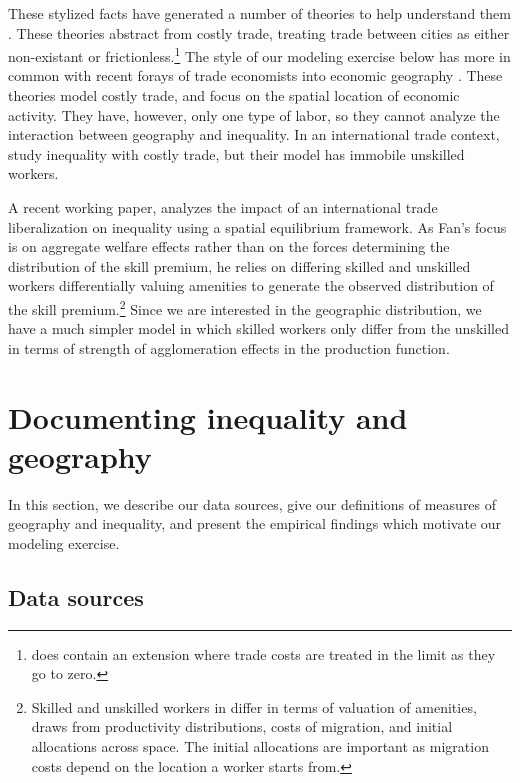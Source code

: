 \documentclass[12 pt]{article}
\begin{document}
These stylized facts have generated a number of theories to help understand them \citep{davis2012spatial,davis2014comparative,baum2012understanding,combes2012sorting}.  These theories abstract from costly trade, treating trade between cities as either non-existant or frictionless.\footnote{\citet{davis2012spatial} does contain an extension where trade costs are treated in the limit as they go to zero.}  The style of our modeling exercise below has more in common with recent forays of trade economists into economic geography \citep{allen2014trade,desmet2014geography,fajgelbaum2015state}.  These theories model costly trade, and focus on the spatial location of economic activity. They have, however, only one type of labor, so they cannot analyze the interaction between geography and inequality.  In an international trade context, \citet{fujita2006globalization} study inequality with costly trade, but their model has immobile unskilled workers.  

A recent working paper, \citet{fan2015internal} analyzes the impact of an international trade liberalization on inequality using a spatial equilibrium framework.  As Fan's focus is on aggregate welfare effects rather than on the forces determining the distribution of the skill premium, he relies on differing skilled and unskilled workers differentially valuing amenities to generate the observed distribution of the skill premium.\footnote{Skilled and unskilled workers in \citet{fan2015internal} differ in terms of valuation of amenities, draws from productivity distributions, costs of migration, and initial allocations across space.  The initial allocations are important as migration costs depend on the location a worker starts from.}  Since we are interested in the geographic distribution, we have a much simpler model in which skilled workers only differ from the unskilled in terms of strength of agglomeration effects in the production function.

\section{Documenting inequality and geography}

In this section, we describe our data sources, give our definitions of measures of geography and inequality, and present the empirical findings which motivate our modeling exercise.  
\subsection{Data sources}
\end{document}
